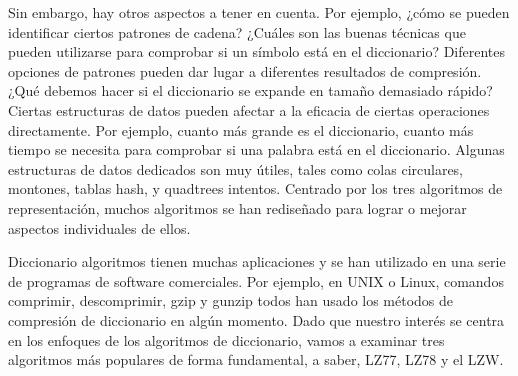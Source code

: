 Sin embargo, hay otros aspectos a tener en cuenta. Por ejemplo, ¿cómo se pueden identificar ciertos patrones de cadena? ¿Cuáles son las buenas técnicas que pueden utilizarse para comprobar si un símbolo está en el diccionario? Diferentes opciones de patrones pueden dar lugar a diferentes resultados de compresión. ¿Qué debemos hacer si el diccionario se expande en tamaño demasiado rápido? Ciertas estructuras de datos pueden afectar a la eficacia de ciertas operaciones directamente. Por ejemplo, cuanto más grande es el diccionario, cuanto más tiempo se necesita para comprobar si una palabra está en el diccionario. Algunas estructuras de datos dedicados son muy útiles, tales como colas circulares, montones, tablas hash, y quadtrees intentos. Centrado por los tres algoritmos de representación, muchos algoritmos se han rediseñado para lograr o mejorar aspectos individuales de ellos.



Diccionario algoritmos tienen muchas aplicaciones y se han utilizado en una serie de programas de software comerciales. Por ejemplo, en UNIX o Linux, comandos comprimir, descomprimir, gzip y gunzip todos han usado los métodos de compresión de diccionario en algún momento. Dado que nuestro interés se centra en los enfoques de los algoritmos de diccionario, vamos a examinar tres algoritmos más populares de forma fundamental, a saber, LZ77, LZ78 y el LZW.


 






